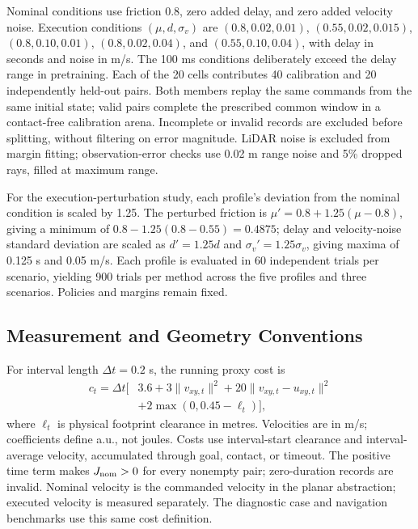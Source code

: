 \documentclass[conference]{IEEEtran}
\begin{document}
Nominal conditions use friction 0.8, zero added delay, and zero added
velocity noise. Execution conditions $(\mu,d,\sigma_v)$ are
$(0.8,0.02,0.01)$, $(0.55,0.02,0.015)$,
$(0.8,0.10,0.01)$, $(0.8,0.02,0.04)$, and
$(0.55,0.10,0.04)$, with delay in seconds and noise in m/s.
The 100 ms conditions deliberately exceed the delay range in pretraining.
Each of the 20 cells contributes 40 calibration and 20 independently
held-out pairs. Both members replay the same commands from the same initial
state; valid pairs complete the prescribed common window in a contact-free
calibration arena. Incomplete or invalid records are excluded before splitting,
without filtering on error magnitude. LiDAR noise is excluded from margin
fitting; observation-error checks use 0.02 m range noise and 5\% dropped rays,
filled at maximum range.

For the execution-perturbation study, each profile's deviation from the nominal
condition is scaled by 1.25. The perturbed friction is
$\mu'=0.8+1.25(\mu-0.8)$, giving a minimum of
$0.8-1.25(0.8-0.55)=0.4875$; delay and velocity-noise standard deviation are
scaled as $d'=1.25d$ and $\sigma_v'=1.25\sigma_v$, giving maxima of
0.125 s and 0.05 m/s. Each profile is evaluated in 60 independent trials per
scenario, yielding 900 trials per method across the five profiles and three
scenarios. Policies and margins remain fixed.

\subsection{Measurement and Geometry Conventions}
For interval length $\Delta t=0.2$ s, the running proxy cost is
\begin{equation}
\begin{split}
c_t=\Delta t\big[&3.6+3\|v_{xy,t}\|^2+
20\|v_{xy,t}-u_{xy,t}\|^2\\
&+2\max(0,0.45-\ell_t)\big],
\end{split}
\end{equation}
where $\ell_t$ is physical footprint clearance in metres. Velocities are in
m/s; coefficients define a.u., not joules. Costs use interval-start clearance
and interval-average velocity, accumulated through goal, contact, or timeout.
The positive time term makes $J_{\rm nom}>0$ for every nonempty pair;
zero-duration records are invalid. Nominal velocity is the commanded velocity
in the planar abstraction; executed velocity is measured separately.
The diagnostic case and navigation benchmarks use this same cost definition.
\end{document}
